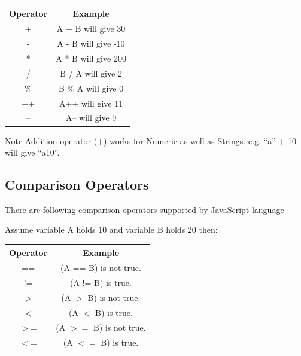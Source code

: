 \documentclass[11pt,a4paper]{article}
\begin{document}
\begin{table}[ht]
\begin{center}
\begin{tabular}{|c | c |} \hline
\textbf{Operator} & \textbf{Example}\\ [0.5ex]\hline
+ &  A + B will give 30\\ \hline
- &  A - B will give -10\\ \hline
* &  A * B will give 200\\ \hline
/ &   B / A will give 2\\ \hline
\% &  B \% A will give 0\\ \hline
++ &  A++ will give 11\\ \hline
-- &  A-- will give 9\\ \hline
\end{tabular}
\end{center}
\end{table}


\begin{bclogo}[couleur=blue!5, arrondi=0.3, logo=\bctrombone]{Note}
Addition operator (+) works for Numeric as well as Strings. e.g. ``a'' + 10 will give ``a10''.
\end{bclogo}

\subsection*{Comparison Operators}

There are following comparison operators supported by JavaScript language

Assume variable A holds 10 and variable B holds 20 then:
\begin{table}[ht]
\begin{center}
\begin{tabular}{|c | c |} \hline
\textbf{Operator}	 &  \textbf{Example}\\[0.5ex]\hline
== &  (A == B) is not true.\\ \hline
!= &  (A != B) is true.\\ \hline
$>$ & (A $>$ B) is not true.\\ \hline
$<$ &  (A $<$ B) is true.\\ \hline
$>$= & (A $>=$ B) is not true.\\ \hline
$<$= & (A $<=$ B) is true.\\ \hline
\end{tabular}
\end{center}
\end{table}
\end{document}

